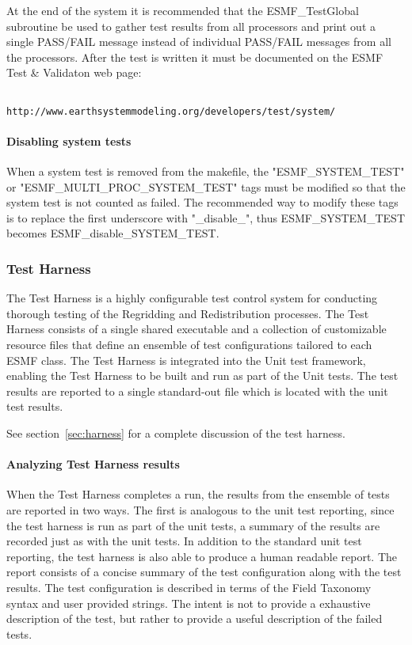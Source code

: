 At the end of the system it is recommended that the ESMF\_TestGlobal subroutine be used to gather
test results from all processors and print out a single PASS/FAIL message instead
of individual PASS/FAIL messages from all the processors.
After the test is written it must be documented on the ESMF Test \& Validaton
web page:

\begin{verbatim}

http://www.earthsystemmodeling.org/developers/test/system/

\end{verbatim}


\paragraph{Disabling system tests}
When a system test is removed from the makefile, the "ESMF\_SYSTEM\_TEST" or 
"ESMF\_MULTI\_PROC\_SYSTEM\_TEST"
tags must be modified so that the system test is not counted as failed. 
The recommended way to modify these tags is to replace the first underscore with "\_disable\_", thus 
ESMF\_SYSTEM\_TEST becomes 
ESMF\_disable\_SYSTEM\_TEST.

\subsubsection{Test Harness}
The Test Harness is a highly configurable test control system for conducting 
thorough testing of the Regridding and Redistribution processes. The Test Harness 
consists of a single shared executable and a collection of customizable resource
files that define an ensemble of test configurations tailored to each ESMF class.
The Test Harness is integrated into the Unit test framework, enabling
the Test Harness to be built and run as part of the Unit tests. The test results 
are reported to a single standard-out file which is located with the unit test 
results.

See section~\ref{sec:harness} for a complete discussion of the test harness.


\paragraph{Analyzing Test Harness results }
When the Test Harness completes a run, the results from the ensemble of tests are
reported in two ways. The first is analogous to the unit test reporting, since the
test harness is run as part of the unit tests, a summary of the results are recorded 
just as with the unit tests. In addition to the standard unit test reporting, the
test harness is also able to produce a human readable report. The report consists 
of a concise summary of the test configuration along with the test results. The test 
configuration is described in terms of the Field Taxonomy syntax and user provided 
strings. The intent is not to provide a exhaustive description of the test, but 
rather to provide a useful description of the failed tests.

